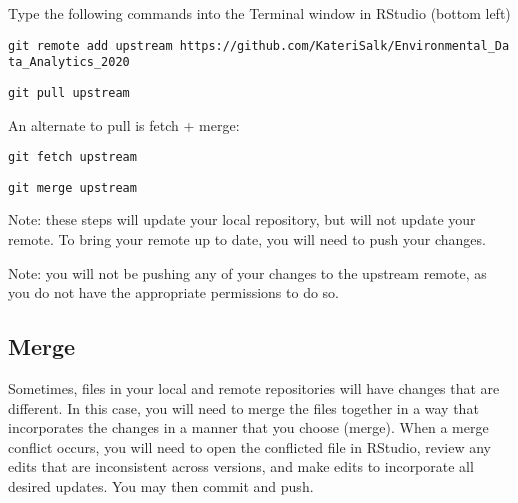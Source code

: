 \documentclass[
]{article}
\begin{document}
Type the following commands into the Terminal window in RStudio (bottom
left)

\texttt{git\ remote\ add\ upstream\ https://github.com/KateriSalk/Environmental\_Data\_Analytics\_2020}

\texttt{git\ pull\ upstream}

An alternate to pull is fetch + merge:

\texttt{git\ fetch\ upstream}

\texttt{git\ merge\ upstream}

Note: these steps will update your local repository, but will not update
your remote. To bring your remote up to date, you will need to push your
changes.

Note: you will not be pushing any of your changes to the upstream
remote, as you do not have the appropriate permissions to do so.

\hypertarget{merge}{%
\subsection{Merge}\label{merge}}

Sometimes, files in your local and remote repositories will have changes
that are different. In this case, you will need to merge the files
together in a way that incorporates the changes in a manner that you
choose (merge). When a merge conflict occurs, you will need to open the
conflicted file in RStudio, review any edits that are inconsistent
across versions, and make edits to incorporate all desired updates. You
may then commit and push.
\end{document}
